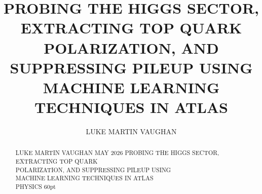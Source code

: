 \documentclass[12pt]{osuthesis}
\title{PROBING THE HIGGS SECTOR, EXTRACTING TOP QUARK POLARIZATION, AND SUPPRESSING PILEUP USING MACHINE LEARNING TECHNIQUES IN ATLAS}
\author{LUKE MARTIN VAUGHAN}
\numberwithin{equation}{section}
\begin{document}
\maketitle


\begin{acknowledge}
 
\end{acknowledge}


\begin{abstract}{LUKE MARTIN VAUGHAN}
{MAY 2026}
{
	PROBING THE HIGGS SECTOR, EXTRACTING TOP QUARK \\
	POLARIZATION, AND SUPPRESSING PILEUP USING \\
	MACHINE LEARNING TECHNIQUES IN ATLAS \\
}
{PHYSICS}
{60pt}
   
\end{abstract}


\renewcommand{\listfigurename}{LIST OF FIGURES}
\renewcommand{\listtablename}{LIST OF TABLES}

{ %


\changepage{-29.43001pt}{}{}{}{}{}{15pt}{12pt}{}
\pagestyle{fancyplain}
\thispagestyle{plain}
\tableofcontents
}

\renewcommand{\cftfigaftersnum}{.}
\renewcommand{\cfttabaftersnum}{.}

\changepage{-29.43001pt}{}{}{}{}{}{15pt}{12pt}{}
\pagestyle{fancyplain}
\thispagestyle{plain}
\ssp
\listoftables
\end{document}
